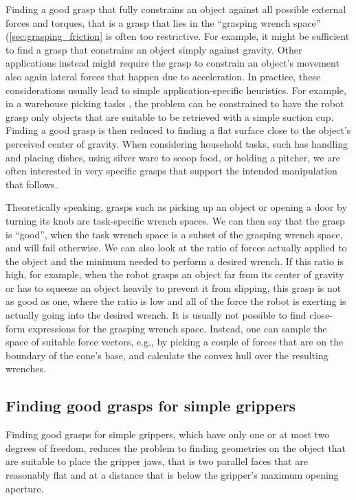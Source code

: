 Finding a good grasp that fully constrains an object against all possible external forces and torques, that is a grasp that lies in the ``grasping wrench space'' (\cref{sec:grasping_friction} is often too restrictive. For example, it might be sufficient to find a grasp that constrains an object simply against gravity. Other applications instead might require the grasp to constrain an object's movement also again lateral forces that happen due to acceleration. In practice, these considerations usually lead to simple application-specific heuristics. For example, in a warehouse picking tasks \cite{correll2016analysis}, the problem can be constrained to have the robot grasp only objects that are suitable to be retrieved with a simple suction cup. Finding a good grasp is then reduced to finding a flat surface close to the object's perceived center of gravity. When considering household tasks, such has handling and placing dishes, using silver ware to scoop food, or holding a pitcher, we are often interested in very specific grasps that support the intended manipulation that follows.

Theoretically speaking, grasps such as picking up an object or opening a door by turning its knob are task-specific wrench spaces. We can then say that the grasp is ``good'', when the task wrench space is a subset of the grasping wrench space, and will fail otherwise. We can also look at the ratio of forces actually applied to the object and the minimum needed to perform a desired wrench. If this ratio is high, for example, when the robot grasps an object far from its center of gravity or has to squeeze an object heavily to prevent it from slipping, this grasp is not as good as one, where the ratio is low and all of the force the robot is exerting is actually going into the desired wrench. It is usually not possible to find close-form expressions for the grasping wrench space. Instead, one can sample the space of suitable force vectors, e.g., by picking a couple of forces that are on the boundary of the cone's base, and calculate the convex hull over the resulting wrenches.

\subsection{Finding good grasps for simple grippers}
Finding good grasps for simple grippers, which have only one or at most two degrees of freedom, reduces the problem to finding geometries on the object that are suitable to place the gripper jaws, that is two parallel faces that are reasonably flat and at a distance that is below the gripper's maximum opening aperture.

